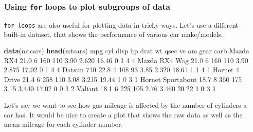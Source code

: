 \documentclass[
]{book}
\newenvironment{Shaded}{\begin{snugshade}}{\end{snugshade}}
\newcommand{\DecValTok}[1]{\textcolor[rgb]{0.00,0.00,0.81}{#1}}
\newcommand{\FloatTok}[1]{\textcolor[rgb]{0.00,0.00,0.81}{#1}}
\newcommand{\KeywordTok}[1]{\textcolor[rgb]{0.13,0.29,0.53}{\textbf{#1}}}
\newcommand{\NormalTok}[1]{#1}
\begin{document}
\hypertarget{using-for-loops-to-plot-subgroups-of-data}{%
\subsubsection*{\texorpdfstring{Using \texttt{for} loops to plot subgroups of data}{Using for loops to plot subgroups of data}}\label{using-for-loops-to-plot-subgroups-of-data}}

\texttt{for\ loops} are also useful for plotting data in tricky ways. Let's use a different built-in dataset, that shows the performance of various car make/models.

\begin{Shaded}
\begin{Highlighting}[]
\KeywordTok{data}\NormalTok{(mtcars)}
\KeywordTok{head}\NormalTok{(mtcars)}
\NormalTok{                   mpg cyl disp  hp drat    wt  qsec vs am gear carb}
\NormalTok{Mazda RX4         }\FloatTok{21.0}   \DecValTok{6}  \DecValTok{160} \DecValTok{110} \FloatTok{3.90} \FloatTok{2.620} \FloatTok{16.46}  \DecValTok{0}  \DecValTok{1}    \DecValTok{4}    \DecValTok{4}
\NormalTok{Mazda RX4 Wag     }\FloatTok{21.0}   \DecValTok{6}  \DecValTok{160} \DecValTok{110} \FloatTok{3.90} \FloatTok{2.875} \FloatTok{17.02}  \DecValTok{0}  \DecValTok{1}    \DecValTok{4}    \DecValTok{4}
\NormalTok{Datsun }\DecValTok{710}        \FloatTok{22.8}   \DecValTok{4}  \DecValTok{108}  \DecValTok{93} \FloatTok{3.85} \FloatTok{2.320} \FloatTok{18.61}  \DecValTok{1}  \DecValTok{1}    \DecValTok{4}    \DecValTok{1}
\NormalTok{Hornet }\DecValTok{4}\NormalTok{ Drive    }\FloatTok{21.4}   \DecValTok{6}  \DecValTok{258} \DecValTok{110} \FloatTok{3.08} \FloatTok{3.215} \FloatTok{19.44}  \DecValTok{1}  \DecValTok{0}    \DecValTok{3}    \DecValTok{1}
\NormalTok{Hornet Sportabout }\FloatTok{18.7}   \DecValTok{8}  \DecValTok{360} \DecValTok{175} \FloatTok{3.15} \FloatTok{3.440} \FloatTok{17.02}  \DecValTok{0}  \DecValTok{0}    \DecValTok{3}    \DecValTok{2}
\NormalTok{Valiant           }\FloatTok{18.1}   \DecValTok{6}  \DecValTok{225} \DecValTok{105} \FloatTok{2.76} \FloatTok{3.460} \FloatTok{20.22}  \DecValTok{1}  \DecValTok{0}    \DecValTok{3}    \DecValTok{1}
\end{Highlighting}
\end{Shaded}

Let's say we want to see how gas mileage is affected by the number of cylinders a car has. It would be nice to create a plot that shows the raw data as well as the mean mileage for each cylinder number.
\end{document}
